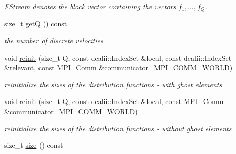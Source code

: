 \begin{DoxyCompactItemize}
\begin{DoxyCompactList}\small\item\em FStream denotes the block vector containing the vectors $ f_1, ..., f_Q $. \item\end{DoxyCompactList}\item 
\hypertarget{classnatrium_1_1DistributionFunctions_a2ab8e5abf8cdef76f62e443a8dde5fd4}{
size\_\-t \hyperlink{classnatrium_1_1DistributionFunctions_a2ab8e5abf8cdef76f62e443a8dde5fd4}{getQ} () const }
\label{classnatrium_1_1DistributionFunctions_a2ab8e5abf8cdef76f62e443a8dde5fd4}

\begin{DoxyCompactList}\small\item\em the number of discrete velocities \item\end{DoxyCompactList}\item 
\hypertarget{classnatrium_1_1DistributionFunctions_aefd3e3b6c39358653ac9531fa9f6f357}{
void \hyperlink{classnatrium_1_1DistributionFunctions_aefd3e3b6c39358653ac9531fa9f6f357}{reinit} (size\_\-t Q, const dealii::IndexSet \&local, const dealii::IndexSet \&relevant, const MPI\_\-Comm \&communicator=MPI\_\-COMM\_\-WORLD)}
\label{classnatrium_1_1DistributionFunctions_aefd3e3b6c39358653ac9531fa9f6f357}

\begin{DoxyCompactList}\small\item\em reinitialize the sizes of the distribution functions -\/ with ghost elements \item\end{DoxyCompactList}\item 
\hypertarget{classnatrium_1_1DistributionFunctions_a4a188cee7a5362588da36e30f616f446}{
void \hyperlink{classnatrium_1_1DistributionFunctions_a4a188cee7a5362588da36e30f616f446}{reinit} (size\_\-t Q, const dealii::IndexSet \&local, const MPI\_\-Comm \&communicator=MPI\_\-COMM\_\-WORLD)}
\label{classnatrium_1_1DistributionFunctions_a4a188cee7a5362588da36e30f616f446}

\begin{DoxyCompactList}\small\item\em reinitialize the sizes of the distribution functions -\/ without ghost elements \item\end{DoxyCompactList}\item 
\hypertarget{classnatrium_1_1DistributionFunctions_a636814c639143c76989b09b2a92b6757}{
size\_\-t \hyperlink{classnatrium_1_1DistributionFunctions_a636814c639143c76989b09b2a92b6757}{size} () const }
\label{classnatrium_1_1DistributionFunctions_a636814c639143c76989b09b2a92b6757}


\end{DoxyCompactItemize}
